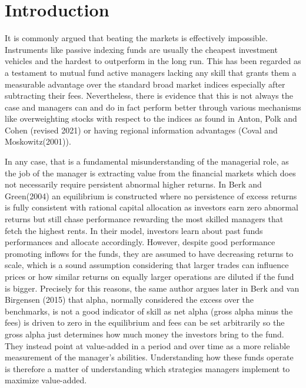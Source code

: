 \documentclass[12pt]{article}
\begin{document}
\newpage

\section{Introduction}

It is commonly argued that beating the markets is effectively impossible. Instruments like passive indexing funds are usually the cheapest investment vehicles and the hardest to outperform in the long run. This has been regarded as a testament to mutual fund active managers lacking any skill that grants them a measurable advantage over the standard broad market indices especially after subtracting their fees. Nevertheless, there is evidence that this is not always the case and managers can and do in fact perform better through various mechanisms like overweighting stocks with respect to the indices as found in Anton, Polk and Cohen (revised 2021)\cite{AntonCohenPolk2021} or having regional information advantages (Coval and Moskowitz(2001)\cite{covalMosko}).\par
In any case, that is a fundamental misunderstanding of the managerial role, as the job of the manager is extracting value from the financial markets which does not necessarily require persistent abnormal higher returns. In Berk and Green(2004)\cite{BerkGreen2004} an equilibrium is constructed where no persistence of excess returns is fully consistent with rational capital allocation as investors earn zero abnormal returns but still chase performance rewarding the most skilled managers that fetch the highest rents. In their model, investors learn about past funds performances and allocate accordingly. However, despite good performance promoting inflows for the funds, they are assumed to have decreasing returns to scale, which is a sound assumption considering that larger trades can influence prices or how similar returns on equally larger operations are diluted if the fund is bigger. Precisely for this reasons, the same author argues later in Berk and van Birgensen (2015)\cite{BERK20151} that alpha, normally considered the excess over the benchmarks, is not a good indicator of skill as net alpha (gross alpha minus the fees) is driven to zero in the equilibrium and fees can be set arbitrarily so the gross alpha just determines how much money the investors bring to the fund. They instead point at value-added in a period and over time as a more reliable measurement of the manager's abilities. Understanding how these funds operate is therefore a matter of understanding which strategies managers implement to maximize value-added. \par
\end{document}
